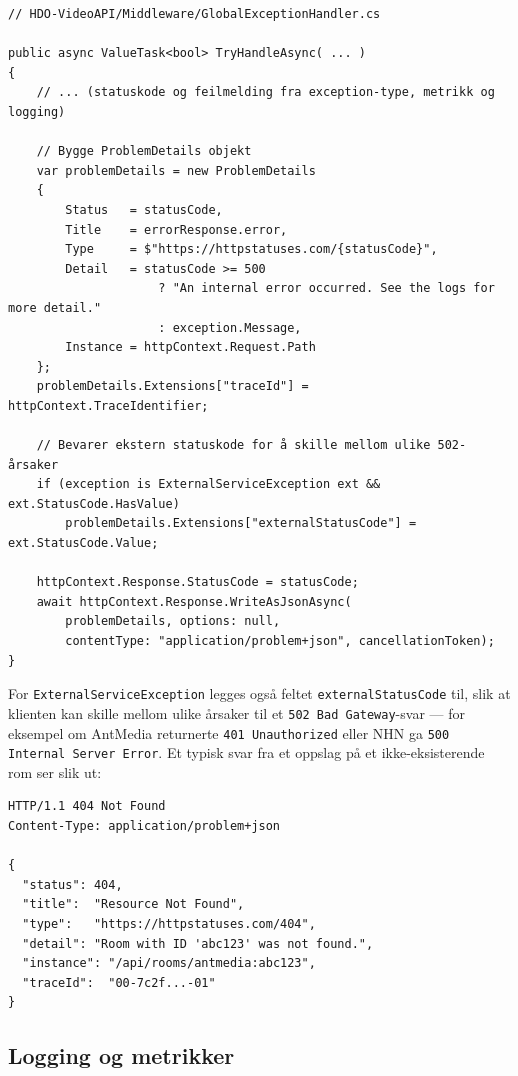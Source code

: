 \begin{lstlisting}[language={[Sharp]C}, caption={Bygging av \texttt{ProblemDetails}-respons.}, label={lst:problemdetails}]
// HDO-VideoAPI/Middleware/GlobalExceptionHandler.cs

public async ValueTask<bool> TryHandleAsync( ... )
{
    // ... (statuskode og feilmelding fra exception-type, metrikk og logging)

    // Bygge ProblemDetails objekt
    var problemDetails = new ProblemDetails
    {
        Status   = statusCode,
        Title    = errorResponse.error,
        Type     = $"https://httpstatuses.com/{statusCode}",
        Detail   = statusCode >= 500
                     ? "An internal error occurred. See the logs for more detail."
                     : exception.Message,
        Instance = httpContext.Request.Path
    };
    problemDetails.Extensions["traceId"] = httpContext.TraceIdentifier;

    // Bevarer ekstern statuskode for å skille mellom ulike 502-årsaker
    if (exception is ExternalServiceException ext && ext.StatusCode.HasValue)
        problemDetails.Extensions["externalStatusCode"] = ext.StatusCode.Value;
    
    httpContext.Response.StatusCode = statusCode;
    await httpContext.Response.WriteAsJsonAsync(
        problemDetails, options: null,
        contentType: "application/problem+json", cancellationToken);
}
\end{lstlisting}

For \texttt{ExternalServiceException} legges også feltet \texttt{externalStatusCode} til, slik at klienten kan skille mellom ulike årsaker til et \texttt{502 Bad Gateway}-svar --- for eksempel om AntMedia returnerte \texttt{401 Unauthorized} eller NHN ga \texttt{500 Internal Server Error}. Et typisk svar fra et oppslag på et ikke-eksisterende rom ser slik ut:

\begin{lstlisting}[caption={Eksempel på Problem Details-respons fra API-et (HTTP 404).}, label={lst:problem-example}]
HTTP/1.1 404 Not Found
Content-Type: application/problem+json

{
  "status": 404,
  "title":  "Resource Not Found",
  "type":   "https://httpstatuses.com/404",
  "detail": "Room with ID 'abc123' was not found.",
  "instance": "/api/rooms/antmedia:abc123",
  "traceId":  "00-7c2f...-01"
}
\end{lstlisting}

\subsection{Logging og metrikker}
\label{subsec:errors-observability}


